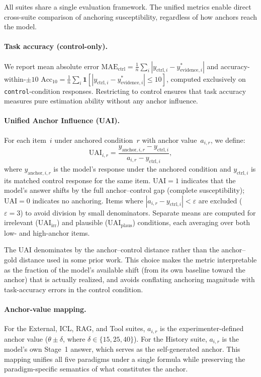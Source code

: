 All suites share a single evaluation framework.
The unified metrics enable direct cross-suite comparison of
anchoring susceptibility, regardless of how anchors reach the
model.

\paragraph{Task accuracy (control-only).}
We report mean absolute error
$\text{MAE}_{\text{ctrl}} =
  \frac{1}{n}\sum_i |y_{\text{ctrl},i} -
  y^{*}_{\text{evidence},i}|$
and accuracy-within-$\pm 10$
$\text{Acc}_{10} =
  \frac{1}{n}\sum_i \mathbf{1}[|y_{\text{ctrl},i} -
  y^{*}_{\text{evidence},i}| \leq 10]$,
computed exclusively on \texttt{control}-condition responses.
Restricting to control ensures that task accuracy measures
pure estimation ability without any anchor influence.

\paragraph{Unified Anchor Influence (UAI).}
For each item~$i$ under anchored condition~$r$ with anchor
value~$a_{i,r}$, we define:
\begin{equation}
  \text{UAI}_{i,r} =
    \frac{y_{\text{anchor},i,r} - y_{\text{ctrl},i}}
         {a_{i,r} - y_{\text{ctrl},i}},
  \label{eq:uai}
\end{equation}
where $y_{\text{anchor},i,r}$ is the model's response under
the anchored condition and $y_{\text{ctrl},i}$ is its
matched control response for the same item.
$\text{UAI} = 1$ indicates that the model's answer shifts by
the full anchor--control gap (complete susceptibility);
$\text{UAI} = 0$ indicates no anchoring.
Items where $|a_{i,r} - y_{\text{ctrl},i}| < \varepsilon$
are excluded ($\varepsilon = 3$) to avoid division by small
denominators.
Separate means are computed for irrelevant
($\text{UAI}_{\text{irr}}$) and plausible
($\text{UAI}_{\text{plaus}}$) conditions, each averaging
over both low- and high-anchor items.

The UAI denominates by the anchor--control distance rather
than the anchor--gold distance used in some prior work.
This choice makes the metric interpretable as the fraction of
the model's available shift (from its own baseline toward the
anchor) that is actually realized, and avoids conflating
anchoring magnitude with task-accuracy errors in the control
condition.

\paragraph{Anchor-value mapping.}
For the External, ICL, RAG, and Tool suites, $a_{i,r}$ is the
experimenter-defined anchor value ($\theta \pm \delta$, where
$\delta \in \{15, 25, 40\}$).
For the History suite, $a_{i,r}$ is the model's own
Stage~1 answer, which serves as the self-generated anchor.
This mapping unifies all five paradigms under a single
formula while preserving the paradigm-specific semantics of
what constitutes the anchor.

